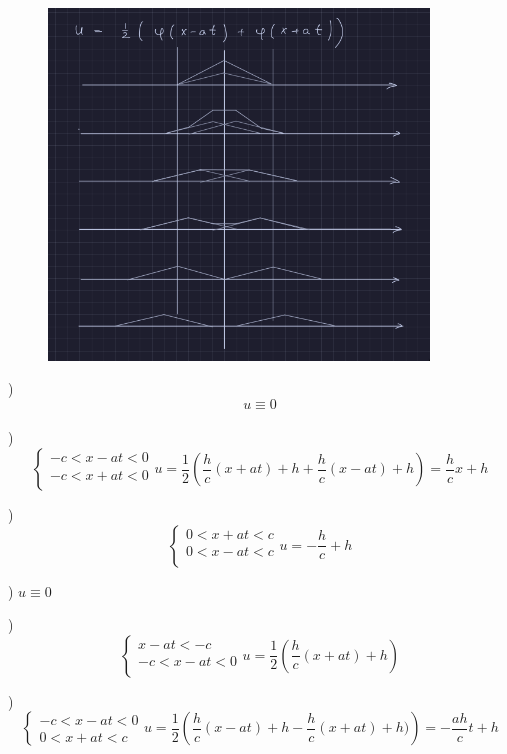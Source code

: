 \documentclass[a4paper]{article}
\begin{document}
\begin{figure}[!ht]
    \centering
    \includegraphics[width=0.90\textwidth]{mp-sem-pic2.png}
\end{figure}


 ) \[ u \equiv 0 \] \\

 ) \[ \begin{cases}
    -c < x - at < 0\\
    -c < x + at < 0\\
\end{cases} 
u = \frac{1}{2} (\frac{h}{c} (x + at) + h + \frac{h}{c} (x - at) + h) = \frac{h
}{c} x + h
\] 

 ) \[
    \begin{cases}
        0 < x + at < c\\
        0 < x - at < c\\
    \end{cases}
    u = -\frac{h}{c} + h
\]

 ) $ u \equiv 0 $ 

 ) 
\[
    \begin{cases}
        x - at < -c\\
        -c < x - at < 0\\
    \end{cases}
    u = \frac{1}{2} (\frac{h}{c} (x + at) + h)
\]

) 
\[
    \begin{cases}
        -c < x - at < 0\\
        0 < x + at < c
    \end{cases}
    u = \frac{1}{2} \left( \frac{h}{c} (x -at) + h - \frac{h}{c} (x + at) + h)
    \right) = -\frac{ah}{c} t + h
\]
\end{document}
